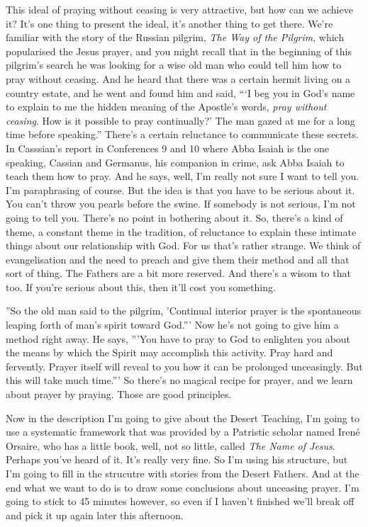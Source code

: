 This ideal of praying without ceasing is very attractive, but how can we achieve it? It's one thing to present the ideal, it's another thing to get there. We're familiar with the story of the Russian pilgrim, \emph{The Way of the Pilgrim}, which popularised the Jesus prayer, and you might recall that in the beginning of this pilgrim's search he was looking for a wise old man who could tell him how to pray without ceasing. And he heard that there was a certain hermit living on a country estate, and he went and found him and said, ```I beg you in God's name to explain to me the hidden meaning of the Apostle's words, \emph{pray without ceasing}. How is it possible to pray continually?' The man gazed at me for a long time before speaking.'' There's a certain reluctance to communicate these secrets. In Casssian's report in Conferences 9 and 10 where Abba Isaiah is the one speaking, Cassian and Germanus, his companion in crime, ask Abba Isaiah to teach them how to pray. And he says, well, I'm really not sure I want to tell you. I'm paraphrasing of course. But the idea is that you have to be serious about it. You can't throw you pearls before the swine. If somebody is not serious, I'm not going to tell you. There's no point in bothering about it. So, there's a kind of theme, a constant theme in the tradition, of reluctance to explain these intimate things about our relationship with God. For us that's rather strange. We think of evangelisation and the need to preach and give them their method and all that sort of thing. The Fathers are a bit more reserved. And there's a wisom to that too. If you're serious about this, then it'll cost you something.

''So the old man said to the pilgrim, 'Continual interior prayer is the spontaneous leaping forth of man's spirit toward God.''' Now he's not going to give him a method right away. He says, '''You have to pray to God to enlighten you about the means by which the Spirit may accomplish this activity. Pray hard and fervently. Prayer itself will reveal to you how it can be prolonged unceasingly. But this will take much time.''' So there's no magical recipe for prayer, and we learn about prayer by praying. Those are good principles.

Now in the description I'm going to give about the Desert Teaching, I'm going to use a systematic framework that was provided by a Patristic scholar named Iren\'{e} Orsaire, who has a little book, well, not so little, called \emph{The Name of Jesus}. Perhaps you've heard of it. It's really very fine. So I'm using his structure, but I'm going to fill in the strucutre with stories from the Desert Fathers. And at the end what we want to do is to draw some conclusions about unceasing prayer. I'm going to stick to 45 minutes however, so even if I haven't finished we'll break off and pick it up again later this afternoon.

